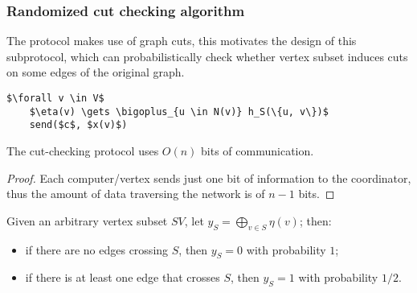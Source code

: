 \subsubsection{Randomized cut checking algorithm}

The protocol makes use of graph cuts, this motivates the design of this subprotocol, which can probabilistically check whether vertex subset induces cuts on some edges of the original graph.

\begin{lstlisting}[caption = {The cut-checking protocol.}, label = alg:cutcheck]
$\forall v \in V$
    $\eta(v) \gets \bigoplus_{u \in N(v)} h_S(\{u, v\})$
    send($c$, $x(v)$)
\end{lstlisting}

\begin{lemma}
    The cut-checking protocol uses $O(n)$ bits of communication.
\end{lemma}

\begin{proof}
    Each computer/vertex sends just one bit of information to the coordinator, thus the amount of data traversing the network is of $n - 1$ bits.
\end{proof}

\begin{lemma}
    Given an arbitrary vertex subset $SV$, let $y_S = \bigoplus_{v \in S} \eta(v)$; then:
    \begin{itemize}
        \item if there are no edges crossing $S$, then $y_S = 0$ with probability $1$;
        \item if there is at least one edge that crosses $S$, then $y_S = 1$ with probability $1/2$.
    \end{itemize}
\end{lemma}


